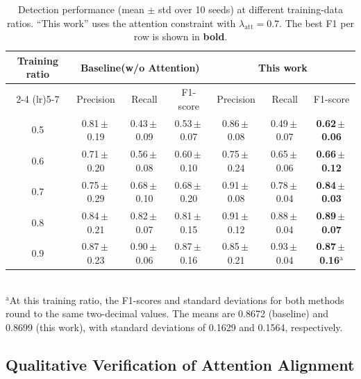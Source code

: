 \documentclass[lettersize,journal]{IEEEtran}
\begin{document}
\begin{table}[]
\centering
\caption{Detection performance (mean $\pm$ std over 10 seeds) at different
training-data ratios. ``This work'' uses the attention constraint with
$\lambda_{\mathrm{att}}=0.7$. The best F1 per row is shown in \textbf{bold}.}
\label{tab:bbox_results}
\setlength{\tabcolsep}{4pt}
\renewcommand{\arraystretch}{1.2}
\begin{tabular}{c ccc ccc}
\toprule
\multirow{2}{*}{Training ratio} &
\multicolumn{3}{c}{Baseline(w/o Attention)} &
\multicolumn{3}{c}{This work} \\
\cmidrule(lr){2-4} \cmidrule(lr){5-7}
 & Precision & Recall & F1-score
 & Precision & Recall & F1-score \\
\midrule
0.5 & 0.81\,$\pm$\,0.19 & 0.43\,$\pm$\,0.09 & 0.53\,$\pm$\,0.07
    & 0.86\,$\pm$\,0.08 & 0.49\,$\pm$\,0.07 & \textbf{0.62\,$\pm$\,0.06} \\
0.6 & 0.71\,$\pm$\,0.20 & 0.56\,$\pm$\,0.08 & 0.60\,$\pm$\,0.10
    & 0.75\,$\pm$\,0.24 & 0.65\,$\pm$\,0.06 & \textbf{0.66\,$\pm$\,0.12} \\
0.7 & 0.75\,$\pm$\,0.29 & 0.68\,$\pm$\,0.10 & 0.68\,$\pm$\,0.20
    & 0.91\,$\pm$\,0.08 & 0.78\,$\pm$\,0.04 & \textbf{0.84\,$\pm$\,0.03} \\
0.8 & 0.84\,$\pm$\,0.21 & 0.82\,$\pm$\,0.07 & 0.81\,$\pm$\,0.15
    & 0.91\,$\pm$\,0.12 & 0.88\,$\pm$\,0.04 & \textbf{0.89\,$\pm$\,0.07} \\
0.9 & 0.87\,$\pm$\,0.23 & 0.90\,$\pm$\,0.06 & 0.87\,$\pm$\,0.16
    & 0.85\,$\pm$\,0.21 & 0.93\,$\pm$\,0.04 & \textbf{0.87\,$\pm$\,0.16}$^{\mathrm{a}}$ \\
\bottomrule
\end{tabular}\\
\vspace{2pt}
\footnotesize $^{\mathrm{a}}$At this training ratio, the F1-scores and standard deviations for both methods round to the same two-decimal values. The means are 0.8672 (baseline) and 0.8699 (this work), with standard deviations of 0.1629 and 0.1564, respectively.
\end{table}

\subsection{Qualitative Verification of Attention Alignment}
\end{document}
